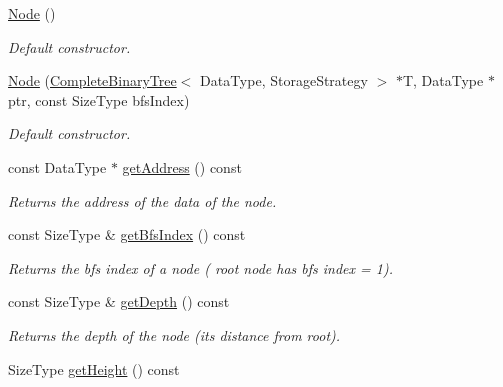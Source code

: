 \begin{DoxyCompactItemize}
\item 
\hypertarget{class_complete_binary_tree_1_1_node_a15ada602ad01736d3e107da31d391d23}{
\hyperlink{class_complete_binary_tree_1_1_node_a15ada602ad01736d3e107da31d391d23}{Node} ()}
\label{class_complete_binary_tree_1_1_node_a15ada602ad01736d3e107da31d391d23}

\begin{DoxyCompactList}\small\item\em Default constructor. \item\end{DoxyCompactList}\item 
\hyperlink{class_complete_binary_tree_1_1_node_ac4466e71737c92edd77d5fd27155ce8a}{Node} (\hyperlink{class_complete_binary_tree}{CompleteBinaryTree}$<$ DataType, StorageStrategy $>$ $\ast$T, DataType $\ast$ptr, const SizeType bfsIndex)
\begin{DoxyCompactList}\small\item\em Default constructor. \item\end{DoxyCompactList}\item 
const DataType $\ast$ \hyperlink{class_complete_binary_tree_1_1_node_a78c55b78241e27d27361b250cf77deb8}{getAddress} () const 
\begin{DoxyCompactList}\small\item\em Returns the address of the data of the node. \item\end{DoxyCompactList}\item 
const SizeType \& \hyperlink{class_complete_binary_tree_1_1_node_a5d57f8452e31eb8680fb186655b840c3}{getBfsIndex} () const 
\begin{DoxyCompactList}\small\item\em Returns the bfs index of a node ( root node has bfs index = 1). \item\end{DoxyCompactList}\item 
const SizeType \& \hyperlink{class_complete_binary_tree_1_1_node_a0745fc163eaa6c63ef8987a2ba881e9e}{getDepth} () const 
\begin{DoxyCompactList}\small\item\em Returns the depth of the node (its distance from root). \item\end{DoxyCompactList}\item 
SizeType \hyperlink{class_complete_binary_tree_1_1_node_ace84ee82db224331db70e9668a4f75c1}{getHeight} () const 

\end{DoxyCompactItemize}
